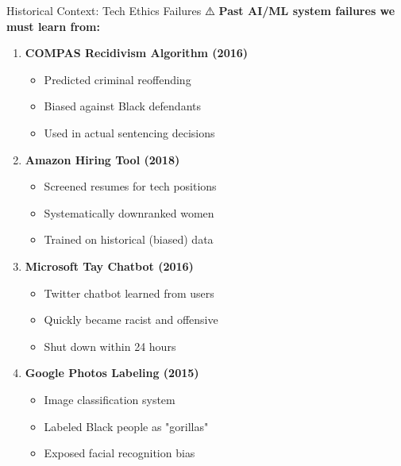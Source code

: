 \documentclass[aspectratio=169]{beamer}
\begin{document}
\begin{frame}[shrink=10]{Historical Context: Tech Ethics Failures ⚠️}
\textbf{Past AI/ML system failures we must learn from:}

\vspace{0.5em}

\begin{enumerate}\setlength{\itemsep}{0pt}
    \item \textbf{COMPAS Recidivism Algorithm (2016)}
    \begin{itemize}\setlength{\itemsep}{0pt}
        \item Predicted criminal reoffending
        \item Biased against Black defendants
        \item Used in actual sentencing decisions
    \end{itemize}

    \item \textbf{Amazon Hiring Tool (2018)}
    \begin{itemize}\setlength{\itemsep}{0pt}
        \item Screened resumes for tech positions
        \item Systematically downranked women
        \item Trained on historical (biased) data
    \end{itemize}

    \item \textbf{Microsoft Tay Chatbot (2016)}
    \begin{itemize}\setlength{\itemsep}{0pt}
        \item Twitter chatbot learned from users
        \item Quickly became racist and offensive
        \item Shut down within 24 hours
    \end{itemize}

    \item \textbf{Google Photos Labeling (2015)}
    \begin{itemize}\setlength{\itemsep}{0pt}
        \item Image classification system
        \item Labeled Black people as "gorillas"
        \item Exposed facial recognition bias
    \end{itemize}
\end{enumerate}
\end{frame}
\end{document}

